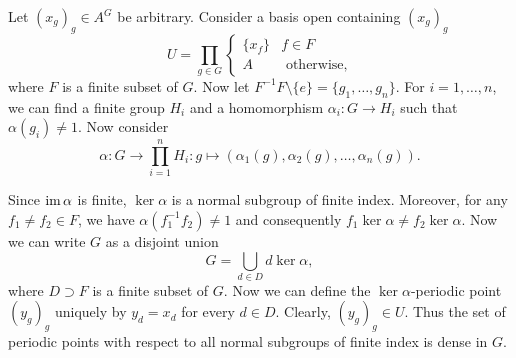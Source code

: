 Let $(x_g)_g \in A^G$ be arbitrary. Consider a basis open containing $(x_g)_g$
\[
			U= \prod_{g \in G} \begin{cases}
				\{x_f\} & f \in F\\
				A & \text{ otherwise,}
			\end{cases}
			\] 
where $F$ is a finite subset of $G$. Now let $F^{-1}F\setminus\{e\} = \{g_1, \dots, g_n\}$. For $i=1, \dots, n$, we can find a finite group $H_i$ and a homomorphism $\alpha_i:G \to H_i$ such that $\alpha(g_i) \neq 1$. Now consider
\[
	\alpha: G \to \prod_{i=1}^n  H_i: g \mapsto (\alpha_1(g), \alpha_2(g), \dots, \alpha_n(g)).
\]

Since $\operatorname{im} \alpha$ is finite, $\ker \alpha$ is a normal subgroup of finite index. Moreover, for any $f_1 \neq f_2 \in F$, we have $\alpha(f_1^{-1}f_2) \neq 1$ and consequently $f_1 \ker \alpha \neq f_2 \ker \alpha$. Now we can write $G$ as a disjoint union
\[
 	G = \bigcup_{d \in D} d \ker \alpha,
 \] 
 where $D \supset F$ is a finite subset of $G$.
 Now we can define the $\ker \alpha$-periodic point $(y_g)_g$ uniquely by $y_d = x_d$ for every $d \in D$. Clearly, $(y_g)_g \in U$. Thus the set of periodic points with respect to all normal subgroups of finite index is dense in $G$.